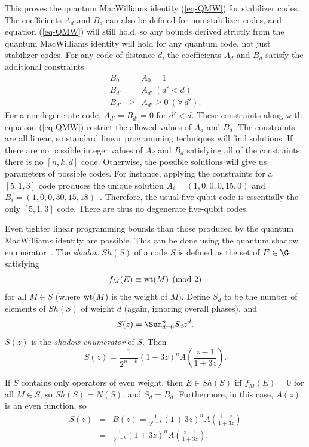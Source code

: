 This proves the quantum MacWilliams identity (\ref{eq-QMW}) for
stabilizer codes.  The coefficients $A_d$ and $B_d$ can also be defined
for non-stabilizer codes, and equation (\ref{eq-QMW}) will still hold, so
any bounds derived strictly from the quantum MacWilliams identity will
hold for any quantum code, not just stabilizer codes.  For any code of
distance $d$, the coefficients $A_d$ and $B_d$ satisfy the additional
constraints
\begin{eqnarray}
	B_0 & = & A_0 = 1 \\
	B_{d'} & = & A_{d'}\ (d' < d) \\
	B_{d'} & \geq & A_{d'} \geq 0\ (\forall\,d').
\end{eqnarray}
For a nondegenerate code, $A_{d'} = B_{d'} = 0$ for $d' < d$.  These
constraints along with equation (\ref{eq-QMW}) restrict the allowed values
of $A_d$ and $B_d$.  The constraints are all linear, so standard linear
programming techniques will find solutions.  If there are no possible
integer values of $A_d$ and $B_d$ satisfying all of the constraints, there is
no $[n, k, d]$ code.  Otherwise, the possible solutions will give us
parameters of possible codes.  For instance, applying the constraints for a
$[5, 1, 3]$ code produces the unique solution $A_i = (1, 0, 0, 0, 15, 0)$ and
$B_i = (1, 0, 0, 30, 15, 18)$~\cite{shor-laflamme-QMW}.  Therefore, the
usual five-qubit code is essentially the only $[5,1,3]$ code.  There are thus
no degenerate five-qubit codes.

Even tighter linear programming bounds than those produced by the
quantum MacWilliams identity are possible.  This can be done using the
quantum shadow enumerator~\cite{rains-shadow}.  The {\em shadow} $Sh(S)$ of
a code $S$ is defined as the set of $E \in \G$ satisfying
\begin{equation}
	f_M (E) \equiv {\rm wt} (M) \pmod{2}
\end{equation}
for all $M \in S$ (where ${\rm wt} (M)$ is the weight of $M$).  Define
$S_d$ to be the number of elements of $Sh(S)$ of weight $d$ (again, ignoring
overall phases), and
\begin{equation}
	S (z) = \Sum_{d=0}^{n} S_d z^d.
\end{equation}
$S(z)$ is the {\em shadow enumerator} of $S$.  Then
\begin{equation}
	S(z) = \frac{1}{2^{n-k}} (1+3z)^n A \left( \frac{z-1}{1+3z} \right).
	\label{eq-shadow}
\end{equation}

If $S$ contains only operators of even weight, then $E \in Sh(S)$ iff $f_M (E)
= 0$ for all $M \in S$, so $Sh(S) = N(S)$, and $S_d = B_d$.  Furthermore, in
this case, $A(z)$ is an even function, so
\begin{eqnarray}
	S(z) & = & B(z) = \frac{1}{2^{n-k}} (1+3z)^n A \left( \frac{1-z}{1+3z} \right)
	\\
	& = & \frac{1}{2^{n-k}} (1+3z)^n A \left( \frac{z-1}{1+3z} \right).
\end{eqnarray}

